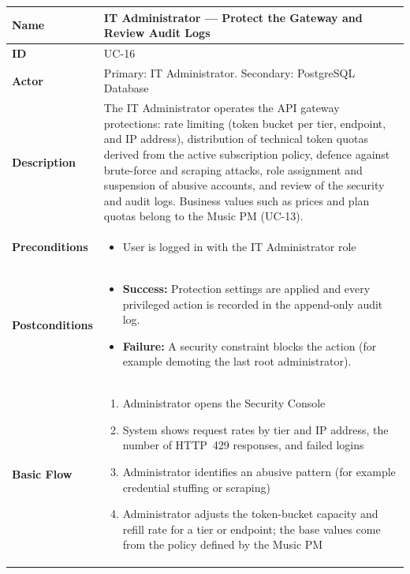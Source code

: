 \documentclass[a4paper]{article}
\newlength{\ucLeft}
\begin{document}
\begin{longtable}{|>{\bfseries}p{\ucLeft}|p{\dimexpr\linewidth-\ucLeft-2\tabcolsep-2\arrayrulewidth}|}
\hline
Name & IT Administrator --- Protect the Gateway and Review Audit Logs \\ \hline
ID & UC-16 \\ \hline
Actor & Primary: IT Administrator. Secondary: PostgreSQL Database \\ \hline
Description & The IT Administrator operates the API gateway protections: rate limiting (token bucket per tier, endpoint, and IP address), distribution of technical token quotas derived from the active subscription policy, defence against brute-force and scraping attacks, role assignment and suspension of abusive accounts, and review of the security and audit logs. Business values such as prices and plan quotas belong to the Music PM (UC-13). \\ \hline
Preconditions &
\begin{itemize}[leftmargin=1em, nosep, topsep=2pt, partopsep=0pt, parsep=0pt, after=\strut]
    \item User is logged in with the IT Administrator role
\end{itemize}
\\ \hline
Postconditions &
\begin{itemize}[leftmargin=1em, nosep, topsep=2pt, partopsep=0pt, parsep=0pt, after=\strut]
    \item \textbf{Success:} Protection settings are applied and every privileged action is recorded in the append-only audit log.
    \item \textbf{Failure:} A security constraint blocks the action (for example demoting the last root administrator).
\end{itemize}
\\ \hline
Basic Flow &
\begin{enumerate}[leftmargin=1.5em, nosep, topsep=2pt, partopsep=0pt, parsep=0pt, after=\strut]
    \item Administrator opens the Security Console
    \item System shows request rates by tier and IP address, the number of HTTP~429 responses, and failed logins
    \item Administrator identifies an abusive pattern (for example credential stuffing or scraping)
    \item Administrator adjusts the token-bucket capacity and refill rate for a tier or endpoint; the base values come from the policy defined by the Music PM

\end{enumerate}
\end{longtable}
\end{document}
